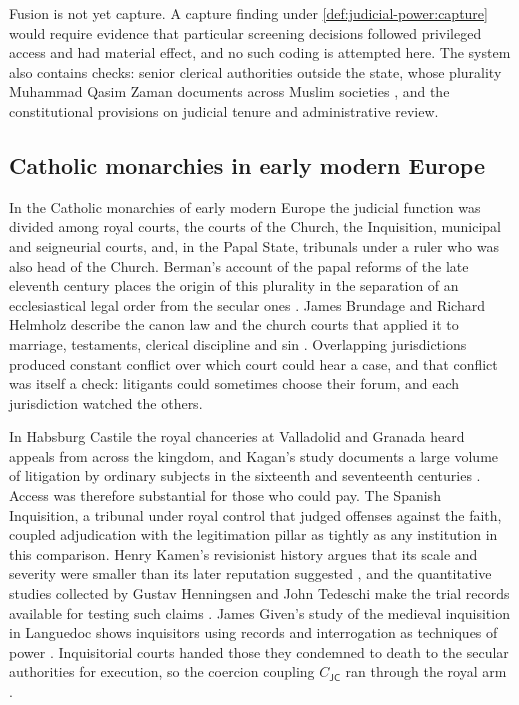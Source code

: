 \documentclass[11pt,letterpaper]{article}
\theoremstyle{definition}
\theoremstyle{remark}
\newcommand{\pJ}{\mathsf{J}}
\newcommand{\pC}{\mathsf{C}}
\begin{document}
Fusion is not yet capture. A capture finding under \cref{def:judicial-power:capture} would require evidence that particular screening decisions followed privileged access and had material effect, and no such coding is attempted here. The system also contains checks: senior clerical authorities outside the state, whose plurality Muhammad Qasim Zaman documents across Muslim societies \citep{zaman2002}, and the constitutional provisions on judicial tenure and administrative review.

\subsection{Catholic monarchies in early modern Europe}

In the Catholic monarchies of early modern Europe the judicial function was divided among royal courts, the courts of the Church, the Inquisition, municipal and seigneurial courts, and, in the Papal State, tribunals under a ruler who was also head of the Church. Berman's account of the papal reforms of the late eleventh century places the origin of this plurality in the separation of an ecclesiastical legal order from the secular ones \citep{berman1983}. James Brundage and Richard Helmholz describe the canon law and the church courts that applied it to marriage, testaments, clerical discipline and sin \citep{brundage1995,helmholz1996}. Overlapping jurisdictions produced constant conflict over which court could hear a case, and that conflict was itself a check: litigants could sometimes choose their forum, and each jurisdiction watched the others.

In Habsburg Castile the royal chanceries at Valladolid and Granada heard appeals from across the kingdom, and Kagan's study documents a large volume of litigation by ordinary subjects in the sixteenth and seventeenth centuries \citep{kagan1981}. Access was therefore substantial for those who could pay. The Spanish Inquisition, a tribunal under royal control that judged offenses against the faith, coupled adjudication with the legitimation pillar as tightly as any institution in this comparison. Henry Kamen's revisionist history argues that its scale and severity were smaller than its later reputation suggested \citep{kamen1997}, and the quantitative studies collected by Gustav Henningsen and John Tedeschi make the trial records available for testing such claims \citep{henningsen1986}. James Given's study of the medieval inquisition in Languedoc shows inquisitors using records and interrogation as techniques of power \citep{given1997}. Inquisitorial courts handed those they condemned to death to the secular authorities for execution, so the coercion coupling $C_{\pJ\pC}$ ran through the royal arm \citep{kamen1997}.
\end{document}
